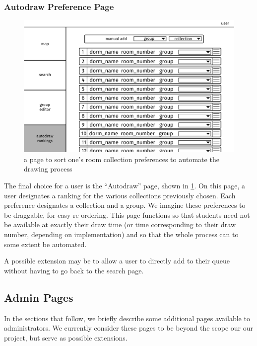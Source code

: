 \subsubsection{Autodraw Preference Page}
\begin{figure} \centering
\includegraphics[scale=.15]{wireframe/autodraw}
\caption{a page to sort one's room collection preferences to automate the
    drawing process}
\label{fig:wireprefs}
\end{figure}

The final choice for a user is the ``Autodraw'' page, shown in
\cref{fig:wireprefs}. On this page, a user designates a ranking for the various
collections previously chosen. Each preference designates a collection and a
group. We imagine these preferences to be draggable, for easy re-ordering. This
page functions so that students need not be available at exactly their draw time
(or time corresponding to their draw number, depending on implementation) and so
that the whole process can to some extent be automated.

A possible extension may be to allow a user to directly add to their queue
without having to go back to the search page.

\subsection{Admin Pages}

In the sections that follow, we briefly describe some additional pages available
to administrators. We currently consider these pages to be beyond the scope our
our project, but serve as possible extensions.

